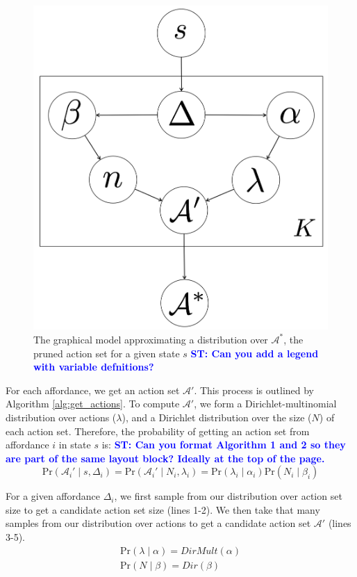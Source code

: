 \documentclass[conference]{IEEEtran}
\newcommand{\stnote}[1]{\textcolor{Blue}{\textbf{ST: #1}}}
\begin{document}
\begin{figure}
\centering
\includegraphics[scale=0.14]{figures/learn_graphical_model.png}%
  \caption{The graphical model approximating a distribution over $\mathcal{A}^*$, the pruned action set for a given state $s$ \stnote{Can you add a legend with variable defnitions?}}
  \label{fig:graphical_model}
\end{figure}

For each affordance, we get an action set $\mathcal{A}'$. This 
process is outlined by Algorithm \ref{alg:get_actions}. To compute $\mathcal{A}'$, we form a Dirichlet-multinomial distribution
over actions ($\lambda$), and a Dirichlet distribution over the size ($N$) of each action set. Therefore, the probability of getting an action set from affordance $i$ in state $s$ is: \stnote{Can you format Algorithm 1 and 2 so they are part of the same layout block?  Ideally at the top of the page.}
\begin{equation}
\text{Pr}(\mathcal{A}_i' \mid s,\Delta_i) = \text{Pr}(\mathcal{A}_i' \mid N_i, \lambda_i) = \text{Pr}(\lambda_i \mid \alpha_i) \text{Pr}(N_i \mid \beta_i)
\end{equation}

For a given affordance $\Delta_i$, we first sample from our distribution over action set size to get a candidate action set size (lines 1-2). We then
take that many samples from our distribution over actions to get a candidate action set $\mathcal{A}'$ (lines 3-5).
\begin{align}
\text{Pr}(\lambda \mid \alpha) = DirMult(\alpha) \\
\text{Pr}(N \mid \beta) = Dir(\beta)
\end{align}
\end{document}
